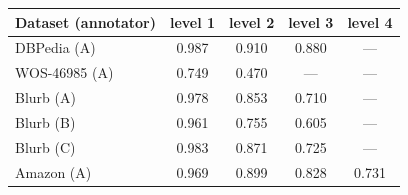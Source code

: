 \begin{tabular}{lcccc}
\toprule
Dataset (annotator) & level 1 & level 2 & level 3 & level 4 \\
\midrule
DBPedia (A) & 0.987 & 0.910 & 0.880 & --- \\
WOS-46985 (A) & 0.749 & 0.470 & --- & --- \\
Blurb (A) & 0.978 & 0.853 & 0.710 & --- \\
Blurb (B) & 0.961 & 0.755 & 0.605 & --- \\
Blurb (C) & 0.983 & 0.871 & 0.725 & --- \\
Amazon (A) & 0.969 & 0.899 & 0.828 & 0.731 \\
\bottomrule
\end{tabular}
